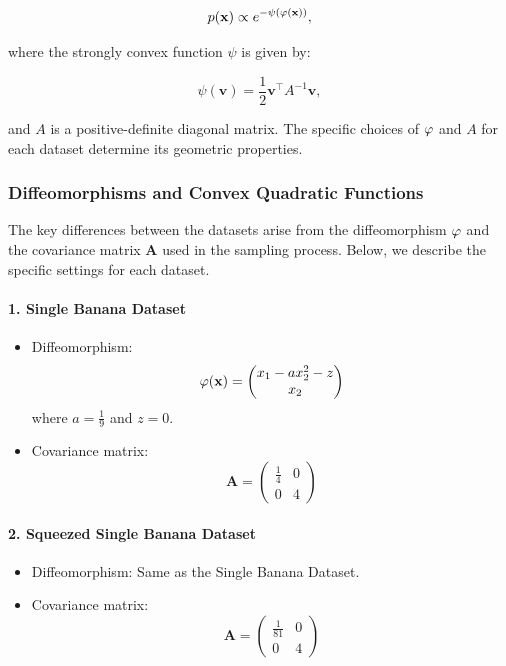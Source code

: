 \begin{equation}
    p(\mathbf{x}) \propto e^{-\psi(\varphi(\mathbf{x}))},
    \label{eq:stroco-diffeo-density-ap}
\end{equation}

where the strongly convex function $\psi$ is given by:

\begin{equation}
    \psi(\mathbf{v}) = \frac{1}{2} \mathbf{v}^\top A^{-1} \mathbf{v},
    \label{eq:quadratic-stroco-ap}
\end{equation}

and $A$ is a positive-definite diagonal matrix. The specific choices of $\varphi$ and $A$ for each dataset determine its geometric properties.

\subsubsection{Diffeomorphisms and Convex Quadratic Functions}

The key differences between the datasets arise from the diffeomorphism $\varphi$ and the covariance matrix $\mathbf{A}$ used in the sampling process. Below, we describe the specific settings for each dataset.

\paragraph{1. Single Banana Dataset}

\begin{itemize}
    \item Diffeomorphism: 
    \[
    \varphi(\mathbf{x}) = \begin{pmatrix} 
    x_1 - a x_2^2 - z \\
    x_2 
    \end{pmatrix}
    \]
    where $a = \frac{1}{9}$ and $z = 0$.
    \item Covariance matrix:
    \[
    \mathbf{A} = \begin{pmatrix} 
    \frac{1}{4} & 0 \\
    0 & 4 
    \end{pmatrix}
    \]
\end{itemize}

\paragraph{2. Squeezed Single Banana Dataset}

\begin{itemize}
    \item Diffeomorphism: Same as the Single Banana Dataset.
    \item Covariance matrix:
    \[
    \mathbf{A} = \begin{pmatrix} 
    \frac{1}{81} & 0 \\
    0 & 4 
    \end{pmatrix}
    \]
\end{itemize}

